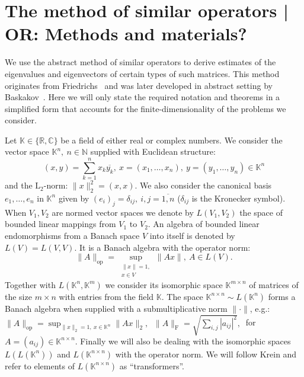 \documentclass[a4paper]{jpconf}
\begin{document}
\section{The method of similar operators | OR: Methods and materials?}

We use the abstract method of similar operators
    to derive estimates of the eigenvalues and eigenvectors
    of certain types of such matrices.
This method originates from Friedrichs~\cite{friedrichs1965advanced}
    and was later developed in abstract setting
    by Baskakov~\cite{baskakov1983methods,baskakov2014memory,baskakov2017method,baskakov2013completeness}.
Here we will only state the required notation and theorems
    in a simplified form that accounts
    for the finite-dimensionality
    of the problems we consider.

Let \( \mathbb{K}\in \{ \mathbb{R}, \mathbb{C} \} \)
    be a field of either real or complex numbers.
We consider the vector space \( \mathbb{K}^n,\ n\in \mathbb{N} \)
    supplied with Euclidean structure:
    \[
        (x, y){=}\sum_{k=1}^n x_k\overline{y_k},
        \ x{=}(x_1,\ldots, x_n),
        \ y=(y_1,\ldots, y_n)
        \in \mathbb{K}^n
        \]
    and the \( \mathrm{L}_2 \)-norm:
    \(
        \|x\|_2^2{=}(x,x).
        \)
We also consider the canonical basis \( e_1, \ldots, e_n \)
    in \( \mathbb{K}^n \) given by
    \( {(e_i)}_j = \delta_{ij},\ i,j=\overline{1,n} \)
    (\(\delta_{ij} \) is the Kronecker symbol).
When \( V_1, V_2 \) are normed vector spaces
    we denote by \( L(V_1, V_2) \)
    the space of bounded linear mappings
    from \( V_1 \) to \( V_2 \).
An algebra of bounded linear endomorphisms
    from a Banach space \( V \)
    into itself
    is denoted by \( L(V) = L(V, V) \).
It is a Banach algebra with the operator norm:
    \[
        \|A\|_{\mathrm{op}} =
        \sup_{
            \substack{\|x\|=1,\\ x\in V}
        } \|A x\|,\ A\in L(V).
        \]
Together with \( L(\mathbb{K}^n, \mathbb{K}^m) \)
    we consider its isomorphic space \( \mathbb{K}^{m{\times}n} \)
    of matrices of the size \( m{\times}n \)
    with entries from the field \( \mathbb{K} \).
The space \( \mathbb{K}^{n{\times}n}\sim L(\mathbb{K}^n) \)
    forms a Banach algebra
    when supplied with a submultiplicative norm
    \( \|\cdot\| \),
    e.g.: \( \|A\|_{\mathrm{op}} = \sup_{\|x\|_2=1,\ x\in \mathbb{K}^n} \|A x\|_2,\ \)
    \( \|A\|_{\mathrm{F}} = \sqrt{\sum_{i,j} |a_{ij}|^2},\ \)
    for 
    \( A{=}(a_{ij})\in\mathbb{K}^{n\times n} \).
Finally we will also be dealing with the isomorphic spaces
    \( L(L(\mathbb{K}^n)) \) and \( L(\mathbb{K}^{n{\times}n}) \)
    with the operator norm.
We will follow Krein
    and refer to elements of \( L(\mathbb{K}^{n{\times}n}) \)
    as ``transformers''.
\end{document}
